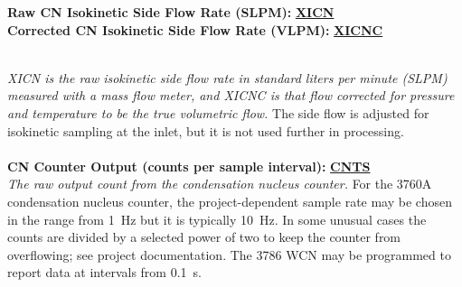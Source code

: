 \begin{hangparagraphs}
\noindent\begin{minipage}[t]{1\columnwidth}%
\textbf{Raw CN Isokinetic Side Flow Rate (SLPM):}\textbf{
}\textbf{\uline{XICN}}\\
\textbf{Corrected CN Isokinetic Side Flow Rate (VLPM):}\textbf{
}\textbf{\uline{XICNC}}\textbf{\uline{}}%
\end{minipage}\\
\emph{XICN is the raw isokinetic side flow rate in standard liters
per minute (SLPM) measured with a mass flow meter, and XICNC is that
flow corrected for pressure and temperature to be the true volumetric
flow.} The side flow is adjusted for
isokinetic sampling at the inlet, but it is not used further in processing.
\\
\\

\textbf{CN Counter Output (counts per sample interval):}\textbf{
}\textbf{\uline{CNTS}}\\
\emph{The raw output count from the condensation nucleus counter.}
For the 3760A condensation nucleus counter, the project-dependent
sample rate may be chosen in the range from 1~Hz but
it is typically 10~Hz. In some unusual cases the counts are divided
by a selected power of two to keep the counter from overflowing; see
project documentation. The 3786 WCN may be programmed to report data
at intervals from 0.1~s.\label{punch:7-1}


\end{hangparagraphs}
